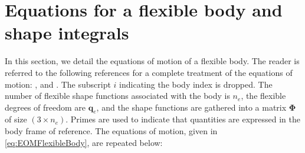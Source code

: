\documentclass[wes, manuscript]{copernicus}
\renewcommand{\v}[1]{\boldsymbol{#1}}
\newcommand{\m}[1]{\boldsymbol{#1}}
\begin{document}




\appendix


\section{Equations for a flexible body and shape integrals}
\label{sec:FlexibleDefinitions}
In this section, we detail the equations of motion of a flexible body. 
The reader is referred to the following references for a complete treatment of the equations of motion: \cite{shabana:book}, \cite{Schwertassek:book} and \cite{Wallrapp:1994}.
% 
% 
% 
The subscript $i$ indicating the body index is dropped. The number of flexible shape functions associated with the body is $n_e$, the flexible degrees of freedom are $\v{q}_e$, and the shape functions are gathered into a matrix $\m{\Phi}$ of size $(3\times n_e)$. Primes are used to indicate that quantities are expressed in the body frame of reference. The equations of motion, given in \autoref{eq:EOMFlexibleBody}, are repeated below:
\end{document}

